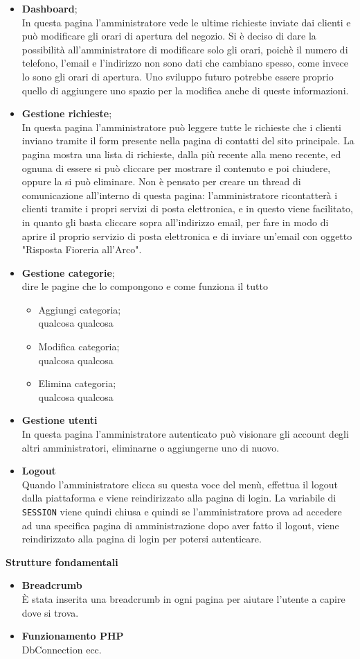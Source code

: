 	\begin{itemize}
		\item \textbf{Dashboard};\\In questa pagina l'amministratore vede le ultime richieste inviate dai clienti e può modificare gli orari di apertura del negozio. Si è deciso di dare la possibilità all'amministratore di modificare solo gli orari, poichè il numero di telefono, l'email e l'indirizzo non sono dati che cambiano spesso, come invece lo sono gli orari di apertura. Uno sviluppo futuro potrebbe essere proprio quello di aggiungere uno spazio per la modifica anche di queste informazioni.
		\item \textbf{Gestione richieste};\\In questa pagina l'amministratore può leggere tutte le richieste che i clienti inviano tramite il form presente nella pagina di contatti del sito principale. La pagina mostra una lista di richieste, dalla più recente alla meno recente, ed ognuna di essere  si può cliccare per mostrare il contenuto e poi chiudere, oppure la si può eliminare. Non è pensato per creare un thread di comunicazione all'interno di questa pagina: l'amministratore ricontatterà i clienti tramite i propri servizi di posta elettronica, e in questo viene facilitato, in quanto gli basta cliccare sopra all'indirizzo email, per fare in modo di aprire il proprio servizio di posta elettronica e di inviare un'email con oggetto "Risposta Fioreria all'Arco".		
		\item \textbf{Gestione categorie};\\dire le pagine che lo compongono e come funziona il tutto
	 	\begin{itemize}
 			\item Aggiungi categoria;\\qualcosa qualcosa
 			\item Modifica categoria;\\qualcosa qualcosa
 			\item Elimina categoria;\\qualcosa qualcosa
	 	\end{itemize}
 	\item \textbf{Gestione utenti}\\In questa pagina l'amministratore autenticato può visionare gli account degli altri amministratori, eliminarne o aggiungerne uno di nuovo. 
 	\item \textbf{Logout}\\Quando l'amministratore clicca su questa voce del menù, effettua il logout dalla piattaforma e viene reindirizzato alla pagina di login. La variabile di \texttt{SESSION} viene quindi chiusa e quindi se l'amministratore prova ad accedere ad una specifica pagina di amministrazione dopo aver fatto il logout, viene reindirizzato alla pagina di login per potersi autenticare.\\
 	\end{itemize}
\textbf{Strutture fondamentali}
\begin{itemize}
	\item \textbf{Breadcrumb}\\	È stata inserita una breadcrumb in ogni pagina per aiutare l'utente a capire dove si trova. 
	\item \textbf{Funzionamento PHP}\\	DbConnection ecc.
\end{itemize}
